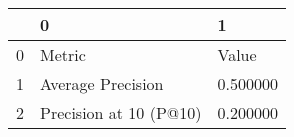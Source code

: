 \begin{tabular}{lll}
\toprule
 & 0 & 1 \\
\midrule
0 & Metric & Value \\
1 & Average Precision & 0.500000 \\
2 & Precision at 10 (P@10) & 0.200000 \\
\bottomrule
\end{tabular}
